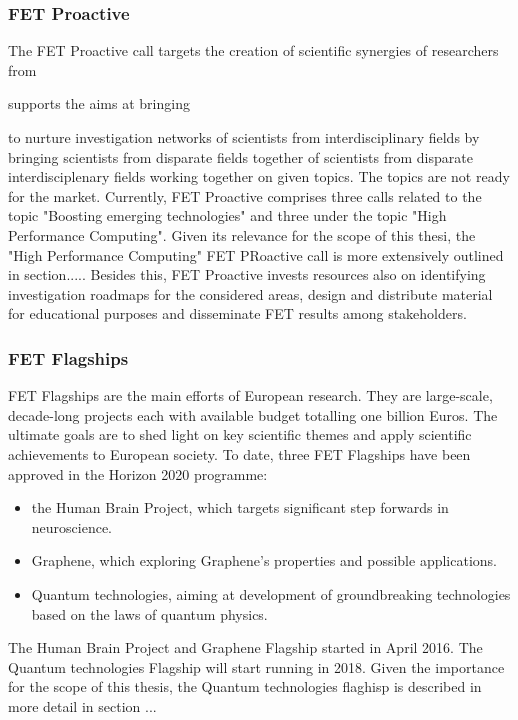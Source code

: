 \subsubsection{FET Proactive}
The FET Proactive call targets the creation of scientific synergies of researchers from 

supports the aims at bringing 

to nurture investigation networks of scientists from interdisciplinary fields by bringing scientists from disparate fields together  of scientists from disparate interdisciplenary fields working together on given topics. The topics are not ready for the market. Currently, FET Proactive comprises three calls related to the topic "Boosting emerging technologies" and three under the topic "High Performance Computing". Given its relevance for the scope of this thesi, the "High Performance Computing" FET PRoactive call is more extensively outlined in section..... Besides this, FET Proactive invests resources also on identifying investigation roadmaps for the considered areas, design and distribute material for educational purposes and disseminate FET results among stakeholders.  

\subsubsection{FET Flagships}
FET Flagships are the main efforts of European research. They are large-scale, decade-long projects each with available budget totalling one billion Euros. The ultimate goals are to shed light on key scientific themes and apply scientific achievements to European society. To date, three FET Flagships have been approved in the Horizon 2020 programme: 

\begin{itemize}
 \item the Human Brain Project, which targets significant step forwards in neuroscience.
 \item Graphene, which exploring Graphene's properties and possible applications.
 \item Quantum technologies, aiming at development of groundbreaking technologies based on the laws of quantum physics.
\end{itemize}
The Human Brain Project and Graphene Flagship started in April 2016. The Quantum technologies Flagship will start running in 2018. Given the importance for the scope of this thesis, the Quantum technologies flaghisp is described in more detail in section ...

